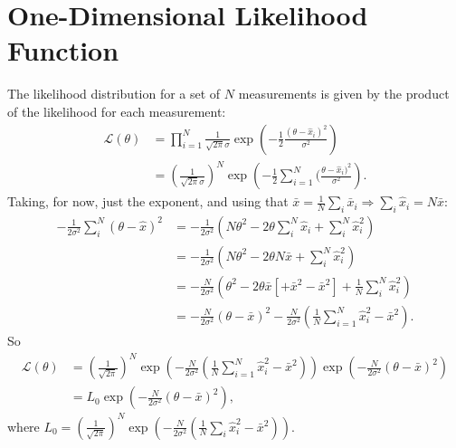 \documentclass[a4paper,11pt,twoside]{article}
\begin{document}
\appendix 
\label{appendix}

\section{One-Dimensional Likelihood Function}
\label{sec:likelihood}
The likelihood distribution for a set of $N$ measurements is given by the product of the likelihood for each measurement:
\begin{align*}
	\mathcal{L}(\theta) &= \prod_{i=1}^{N} \frac{1}{\sqrt{2\pi}\sigma}\exp\left(-\frac{1}{2}\frac{(\theta - \hat{x}_i)^2}{\sigma^2}\right)
	\\ &= \left(\frac{1}{\sqrt{2\pi}\sigma}\right)^N \exp\left(-\frac{1}{2}\sum_{i=1}^{N}(\frac{\theta - \hat{x}_i)^2}{\sigma^2}\right).
\end{align*}
Taking, for now, just the exponent, and using that $\bar{x} = \frac{1}{N} \sum_i \bar{x}_i \Rightarrow \sum_i \hat{x}_i = N \bar{x}$:
\begin{align*}
	-\frac{1}{2\sigma^2}\sum_i^N(\theta - \hat{x})^2 &= -\frac{1}{2\sigma^2}(N\theta^2 - 2\theta \sum_i^N\hat{x}_i + \sum_i^N \hat{x}_i^2) 
	\\ &= -\frac{1}{2\sigma^2}(N\theta^2 - 2\theta N \bar{x} + \sum_i^N \hat{x}_i^2) 
	\\ &= -\frac{N}{2\sigma^2} (\theta^2 - 2\theta \bar{x} [ + \bar{x}^2 - \bar{x}^2]  + \frac{1}{N} \sum_i^N \hat{x}_i^2) 
	\\ &= -\frac{N}{2 \sigma^2} (\theta - \bar{x})^2 - \frac{N}{2 \sigma^2}(\frac{1}{N} \sum_{i=1}^{N} \hat{x}_i^2 - \bar{x}^2).
\end{align*}
So
\begin{align*}
	\mathcal{L}(\theta) &= \left( \frac{1}{\sqrt{2\pi}} \right)^N \exp \left(- \frac{N}{2 \sigma^2}(\frac{1}{N} \sum_{i=1}^{N} \hat{x}_i^2 - \bar{x}^2)\right) \exp \left(-\frac{N}{2 \sigma^2} (\theta - \bar{x})^2 \right)
	\\ &= L_0 \exp \left( -\frac{N}{2 \sigma^2} (\theta - \bar{x})^2 \right),
\end{align*}
where $L_0 = \left( \frac{1}{\sqrt{2\pi}} \right)^N \exp \left(- \frac{N}{2 \sigma^2}(\frac{1}{N} \sum_i \hat{x}_i^2 - \bar{x}^2)\right)$.
\end{document}
